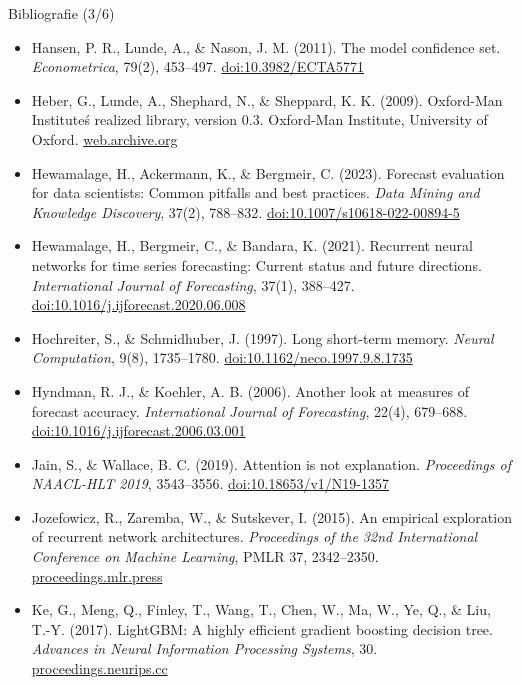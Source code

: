 \begin{frame}{Bibliografie (3/6)}
\itemsize{\tiny}
\begin{itemize}
    \item Hansen, P. R., Lunde, A., \& Nason, J. M. (2011). The model confidence set. \textit{Econometrica}, 79(2), 453--497. \href{https://doi.org/10.3982/ECTA5771}{doi:10.3982/ECTA5771}
    \item Heber, G., Lunde, A., Shephard, N., \& Sheppard, K. K. (2009). Oxford-Man Institute\'s realized library, version 0.3. Oxford-Man Institute, University of Oxford. \href{https://web.archive.org/web/20220301022212/https://realized.oxford-man.ox.ac.uk/}{web.archive.org}
    \item Hewamalage, H., Ackermann, K., \& Bergmeir, C. (2023). Forecast evaluation for data scientists: Common pitfalls and best practices. \textit{Data Mining and Knowledge Discovery}, 37(2), 788--832. \href{https://doi.org/10.1007/s10618-022-00894-5}{doi:10.1007/s10618-022-00894-5}
    \item Hewamalage, H., Bergmeir, C., \& Bandara, K. (2021). Recurrent neural networks for time series forecasting: Current status and future directions. \textit{International Journal of Forecasting}, 37(1), 388--427. \href{https://doi.org/10.1016/j.ijforecast.2020.06.008}{doi:10.1016/j.ijforecast.2020.06.008}
    \item Hochreiter, S., \& Schmidhuber, J. (1997). Long short-term memory. \textit{Neural Computation}, 9(8), 1735--1780. \href{https://doi.org/10.1162/neco.1997.9.8.1735}{doi:10.1162/neco.1997.9.8.1735}
    \item Hyndman, R. J., \& Koehler, A. B. (2006). Another look at measures of forecast accuracy. \textit{International Journal of Forecasting}, 22(4), 679--688. \href{https://doi.org/10.1016/j.ijforecast.2006.03.001}{doi:10.1016/j.ijforecast.2006.03.001}
    \item Jain, S., \& Wallace, B. C. (2019). Attention is not explanation. \textit{Proceedings of NAACL-HLT 2019}, 3543--3556. \href{https://doi.org/10.18653/v1/N19-1357}{doi:10.18653/v1/N19-1357}
    \item Jozefowicz, R., Zaremba, W., \& Sutskever, I. (2015). An empirical exploration of recurrent network architectures. \textit{Proceedings of the 32nd International Conference on Machine Learning}, PMLR 37, 2342--2350. \href{https://proceedings.mlr.press/v37/jozefowicz15.html}{proceedings.mlr.press}
    \item Ke, G., Meng, Q., Finley, T., Wang, T., Chen, W., Ma, W., Ye, Q., \& Liu, T.-Y. (2017). LightGBM: A highly efficient gradient boosting decision tree. \textit{Advances in Neural Information Processing Systems}, 30. \href{https://proceedings.neurips.cc/paper/2017/hash/6449f44a102fde848669bdd9eb6b76fa-Abstract.html}{proceedings.neurips.cc}

\end{itemize}
\end{frame}
